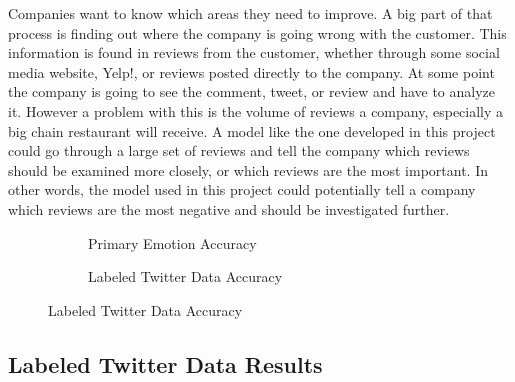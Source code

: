 \documentclass[titlepage,letterpaper]{article}
\begin{document}

Companies want to know which areas they need to improve. A big part of that process is finding out where the company is going wrong with the customer. This information is found in reviews from the customer, whether through some social media website, Yelp!, or reviews posted directly to the company. At some point the company is going to see the comment, tweet, or review and have to analyze it. However a problem with this is the volume of reviews a company, especially a big chain restaurant will receive. A model like the one developed in this project could go through a large set of reviews and tell the company which reviews should be examined more closely, or which reviews are the most important. In other words, the model used in this project could potentially tell a company which reviews are the most negative and should be investigated further.   


		
\begin{figure}[]
	\hfill
	\vspace*{-1in}
	\centering
	\begin{adjustwidth}{-.75in}{-.75in}
		
 \begin{subfigure}{3in}
 	\centering
	\resizebox{3in}{!}{}
	\caption{Primary Emotion Accuracy}\label{primemresult}
\end{subfigure}
\hfill
\begin{subfigure}{3in}
	\centering
	\resizebox{3in}{!}{}
	\caption{Labeled Twitter Data Accuracy} \label{lbtwitresult}
\end{subfigure}
\hfill
\end{adjustwidth}
\end{figure}
\subsection{Labeled Twitter Data Results}
\end{document}
